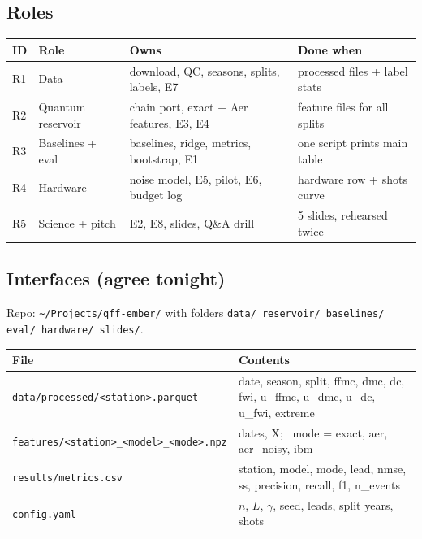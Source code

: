 \documentclass[11pt,a4paper]{article}
\newcommand{\code}[1]{\texttt{\small #1}}
\begin{document}
\subsection{Roles}
\begin{center}\small
\begin{tabularx}{\linewidth}{@{}l l Y Y@{}}
\toprule
\textbf{ID} & \textbf{Role} & \textbf{Owns} & \textbf{Done when}\\
\midrule
R1 & Data & download, QC, seasons, splits, labels, E7 & processed files + label stats\\
R2 & Quantum reservoir & chain port, exact + Aer features, E3, E4 & feature files for all splits\\
R3 & Baselines + eval & baselines, ridge, metrics, bootstrap, E1 & one script prints main table\\
R4 & Hardware & noise model, E5, pilot, E6, budget log & hardware row + shots curve\\
R5 & Science + pitch & E2, E8, slides, Q\&A drill & 5 slides, rehearsed twice\\
\bottomrule
\end{tabularx}
\end{center}

\subsection{Interfaces (agree tonight)}
Repo: \code{\textasciitilde/Projects/qff-ember/} with folders \code{data/ reservoir/ baselines/ eval/ hardware/
slides/}.
\begin{center}\small
\begin{tabularx}{\linewidth}{@{}l Y@{}}
\toprule
\textbf{File} & \textbf{Contents}\\
\midrule
\code{data/processed/<station>.parquet} & date, season, split, ffmc, dmc, dc, fwi, u\_ffmc, u\_dmc, u\_dc, u\_fwi,
extreme\\
\code{features/<station>\_<model>\_<mode>.npz} & dates, X; \ mode = exact, aer, aer\_noisy, ibm\\
\code{results/metrics.csv} & station, model, mode, lead, nmse, ss, precision, recall, f1, n\_events\\
\code{config.yaml} & $n$, $L$, $\gamma$, seed, leads, split years, shots\\
\bottomrule
\end{tabularx}
\end{center}
\end{document}
